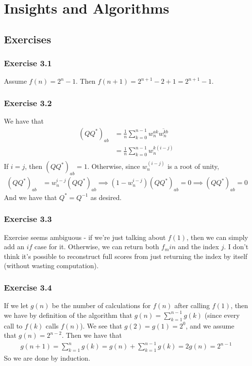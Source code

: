 \section{Insights and Algorithms}

\subsection{Exercises}

\subsubsection{Exercise 3.1}
Assume $f(n) = 2^{n} - 1$. Then $f(n + 1) = 2^{n + 1} - 2 + 1 = 2^{n + 1} - 1$.

\subsubsection{Exercise 3.2}
We have that
\begin{align*}
        (QQ^* )_{ab} &= \frac{1}{n}\sum_{k = 0}^{n - 1} w_n^{ak} \overline{w_n^{kb}} \\
                     &= \frac{1}{n}\sum_{k = 0}^{n - 1} w_n^{k(i - j)}\\
\end{align*}
If $i = j$, then $(QQ^*)_{ab} = 1$. Otherwise, since $w_n^{(i - j)}$ is a root of unity,
\begin{align*}
        (QQ^*)_{ab} &= w_n^{i - j} (QQ^*)_{ab} \implies (1 - w_n^{i - j}) (QQ^*)_{ab} = 0 \implies
        (QQ^*)_{ab} = 0
\end{align*}
And we have that $Q^* = Q^{-1}$ as desired.

\subsubsection{Exercise 3.3}
Exercise seems ambiguous - if we're just talking about $f(1)$, then we can simply add an $if$ case for it.
Otherwise, we can return both $f_min$ and the index $j$. I don't think it's possible to 
reconstruct full scores from just returning the index by itself (without wasting computation).

\subsubsection{Exercise 3.4}
If we let $g(n)$ be the number of calculations for $f(n)$ after calling $f(1)$, then we have by definition
of the algorithm that $g(n) = \sum_{k = 1}^{n - 1} g(k)$ (since every call to $f(k)$ calls $f(n)$).
We see that $g(2) = g(1) = 2^0$, and we assume that $g(n) = 2^{n - 2}$. Then we have that
\begin{align*}
        g(n + 1) = \sum_{k = 1}^{n} g(k) = g(n) + \sum_{k = 1}^{n - 1} g(k) = 2g(n) = 2^{n - 1}
\end{align*}
So we are done by induction.

